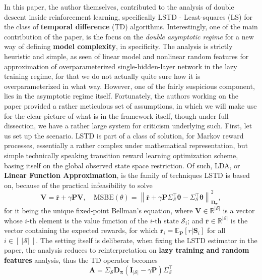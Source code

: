 In this paper, the author themselves, contributed to the analysis of double descent inside reinforcement learning, specifically LSTD - Least-squares (LS) for the class of \textbf{temporal difference} (TD) algorithms. Interestingly, one of the main contribution of the paper, is the focus on the \textit{double asymptotic regime} for a new way of defining \textbf{model complexity}, in specificity. The analysis is strictly heuristic and simple, as seen of linear model and nonlinear random features for approximation of overparameterized single-hidden-layer network in the lazy training regime, for that we do not actually quite sure how it is overparameterized in what way. However, one of the fairly suspicious component, lies in the asymptotic regime itself. Fortunately, the authors working on the paper provided a rather meticulous set of assumptions, in which we will make use for the clear picture of what is in the framework itself, though under full dissection, we have a rather large system for criticism underlying such. First, let us set up the scenario. LSTD is part of a class of solution, for Markov reward processes, essentially a rather complex under mathematical representation, but simple technically speaking transition reward learning optimization scheme, basing itself on the global observed state space restriction. Of such, LDA, or \textbf{Linear Function Approximation}, is the family of techniques LSTD is based on, because of the practical infeasibility to solve
\begin{equation}
   \bm{V}=\bar{\bm{r}} + \gamma \bm{P} \bm{V},\quad \mathrm{MSBE}(\theta)
=
\left\|
\bar{\bm{r}}
+
\gamma \bm{P} \Sigma_\mathcal{S}^{\top}\bm{\theta}
-
\Sigma_\mathcal{S}^{\top}\bm{\theta}
\right\|_{\bm{D}_{\bm{\pi}}}^{2},
   \label{def:bellman_eq_MSE}
\end{equation}
for it being the unique fixed-point Bellman's equation, where $\bm{V} \in \mathbb{R}^{\lvert \mathcal{S} \rvert}$ is a vector whose $i$-th element is the value function of the $i$-th state $\mathcal{S}_{i}$; and $\bar{\bm{r}} \in \mathbb{R}^{\lvert \mathcal{S} \rvert}$ is the vector containing the expected rewards, for which $\bar{\bm{r}}_{i} = \mathbb{E}_{\bm{P}}[r|\bm{S}_i]$ for all $i \in [~\lvert \mathcal{S} \rvert~]$. The setting itself is deliberate, when fixing the LSTD estimator in the paper, the analysis reduces to reinterpretation on \textbf{lazy training and random features} analysis, thus the TD operator becomes 
\begin{equation}
    \mathbf{A} = \Sigma_{\mathcal{S}} \mathbf{D}_{\bm{\pi}} \left(\mathbf{I}_{|\mathcal{S}|} - \gamma \mathbf{P}\right) \Sigma_{\mathcal{S}}^{\top}
\end{equation}
